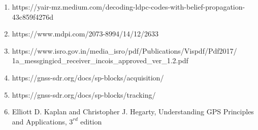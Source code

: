 \begin{enumerate}
	\item https://yair-mz.medium.com/decoding-ldpc-codes-with-belief-propagation-43c859f4276d
	
	\item https://www.mdpi.com/2073-8994/14/12/2633
	
	\item https://www.isro.gov.in/media\_isro/pdf/Publications/Vispdf/Pdf2017/\\1a\_messgingicd\_receiver\_incois\_approved\_ver\_1.2.pdf

	\item https://gnss-sdr.org/docs/sp-blocks/acquisition/

	\item https://gnss-sdr.org/docs/sp-blocks/tracking/
   
	\item Elliott D. Kaplan and Christopher J. Hegarty,  Understanding {GPS} {P}rinciples and {A}pplications, $3^{rd}$ edition
\end{enumerate}
\let\cleardoublepage\clearpage  %
